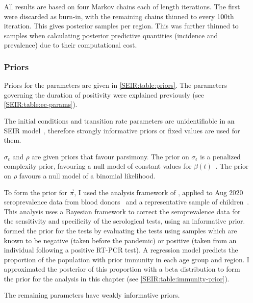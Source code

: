 \documentclass[thesis.tex]{subfiles}
\begin{document}
All results are based on four Markov chains each of length  iterations.
The first  were discarded as burn-in, with the remaining chains thinned to every 100th iteration.
This gives  posterior samples per region.
This was further thinned to  samples when calculating posterior predictive quantities (incidence and prevalence) due to their computational cost.

\subsubsection{Priors} \label{SEIR:sec:priors}

Priors for the parameters are given in \cref{SEIR:table:priors}.
The parameters governing the duration of positivity were explained previously (see \cref{SEIR:table:ec-params}).

The initial conditions and transition rate parameters are unidentifiable in an SEIR model~\autocite{dankwaStructural}, therefore strongly informative priors or fixed values are used for them.

$\sigma_\epsilon$ and $\rho$ are given priors that favour parsimony.
The prior on $\sigma_\epsilon$ is a penalized complexity prior, favouring a null model of constant values for $\beta(t)$~\autocite{simpsonPenalising}.
The prior on $\rho$ favours a null model of a binomial likelihood.

To form the prior for $\vec{\pi}$, I used the analysis framework of \textcite{amirthalingamSeroprevalence}, applied to Aug 2020 seroprevalence data from blood donors~\autocite{amirthalingamSeroprevalence} and a representative sample of children~\autocite{ratcliffeCommunity}.
This analysis uses a Bayesian framework to correct the seroprevalence data for the sensitivity and specificity of the serological tests, using an informative prior.
\Textcite{amirthalingamSeroprevalence} formed the prior for the tests by evaluating the tests using samples which are known to be negative (taken before the pandemic) or positive (taken from an individual following a positive RT-PCR test).
A regression model predicts the proportion of the population with prior immunity in each age group and region.
I approximated the posterior of this proportion with a beta distribution to form the prior for the analysis in this chapter (see \cref{SEIR:table:immunity-prior}).

The remaining parameters have weakly informative priors.
\end{document}
